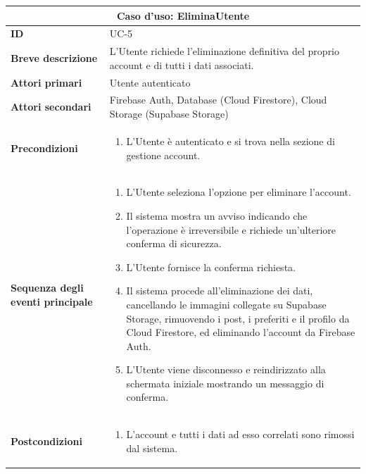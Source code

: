 \documentclass[a4paper]{report}
\begin{document}
\begin{table}[H]
\vspace*{-0cm}
\renewcommand{\arraystretch}{1.9}
\begin{tabular}{|p{3.9cm}|p{9.9cm}|}
\hline
\multicolumn{2}{|c|}{\textbf{Caso d’uso: EliminaUtente}} \\ \hline
\textbf{ID} & UC-5 \\ \hline
\textbf{Breve descrizione} & L'Utente richiede l'eliminazione definitiva del proprio account e di tutti i dati associati. \\ \hline
\textbf{Attori primari} & Utente autenticato \\ \hline
\textbf{Attori secondari} & Firebase Auth, Database (Cloud Firestore), Cloud Storage (Supabase Storage) \\ \hline
\textbf{Precondizioni} & \begin{enumerate}[leftmargin=14pt,label=\arabic*.,labelsep=0.5em,topsep=0pt,partopsep=0pt,parsep=0pt,itemsep=0pt]
    \item L'Utente è autenticato e si trova nella sezione di gestione account.
\end{enumerate} \\ \hline
\textbf{Sequenza degli eventi principale} &
\begin{enumerate}[leftmargin=14pt,label=\arabic*.,labelsep=0.5em,topsep=0pt,partopsep=0pt,parsep=0pt,itemsep=0pt]
   \item L'Utente seleziona l'opzione per eliminare l'account.
   \item Il sistema mostra un avviso indicando che l'operazione è irreversibile e richiede un'ulteriore conferma di sicurezza.
   \item L'Utente fornisce la conferma richiesta.
   \item Il sistema procede all’eliminazione dei dati, cancellando le immagini collegate su Supabase Storage, rimuovendo i post, i preferiti e il profilo da Cloud Firestore, ed eliminando l’account da Firebase Auth.
   \item L'Utente viene disconnesso e reindirizzato alla schermata iniziale mostrando un messaggio di conferma.
\end{enumerate}\\ \hline
\textbf{Postcondizioni} &
\begin{enumerate}[leftmargin=14pt,label=\arabic*.,labelsep=0.5em,topsep=0pt,partopsep=0pt,parsep=0pt,itemsep=0pt]
\item L'account e tutti i dati ad esso correlati sono rimossi dal sistema.

\end{enumerate}
\end{tabular}
\end{table}
\end{document}
